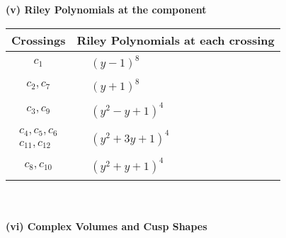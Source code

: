 \documentclass[1p]{elsarticle_modified}
\theoremstyle{definition}
\begin{document}
\newpage\renewcommand{\arraystretch}{1}
\flushleft \textbf{(v) Riley Polynomials at the component}\newline \\
\begin{tabular}{m{50pt}|m{274pt}}
Crossings & \hspace{64pt}Riley Polynomials at each crossing \\
\hline $$\begin{aligned}c_{1}\end{aligned}$$&$\begin{aligned}
&(y-1)^8
\end{aligned}$\\
\hline $$\begin{aligned}c_{2},c_{7}\end{aligned}$$&$\begin{aligned}
&(y+1)^8
\end{aligned}$\\
\hline $$\begin{aligned}c_{3},c_{9}\end{aligned}$$&$\begin{aligned}
&(y^2- y+1)^4
\end{aligned}$\\
\hline $$\begin{aligned}c_{4},c_{5},c_{6}\\c_{11},c_{12}\end{aligned}$$&$\begin{aligned}
&(y^2+3 y+1)^4
\end{aligned}$\\
\hline $$\begin{aligned}c_{8},c_{10}\end{aligned}$$&$\begin{aligned}
&(y^2+y+1)^4
\end{aligned}$\\
\hline
\end{tabular}\\~\\
\newpage\flushleft \textbf{(vi) Complex Volumes and Cusp Shapes}
\end{document}

